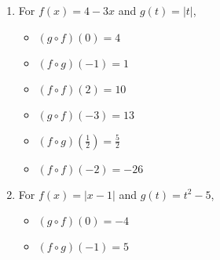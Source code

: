 \begin{enumerate}
\begin{multicols}{3}
\begin{itemize}
\item  $(g\circ f)(-3) = -48$

\item  $(f\circ g)\left(\frac{1}{2}\right) = \frac{13}{4}$

\item  $(f \circ f)(-2) = -2$

\end{itemize}

\end{multicols}

\item  For   $f(x) = 4-3x$ and  $g(t) = |t|$,
\begin{multicols}{3}

\begin{itemize}

\item  $(g\circ f)(0) = 4$

\item  $(f\circ g)(-1) = 1$

\item  $(f \circ f)(2) = 10$

\end{itemize}

\end{multicols}

\begin{multicols}{3}

\begin{itemize}

\item  $(g\circ f)(-3) = 13$

\item  $(f\circ g)\left(\frac{1}{2}\right) = \frac{5}{2}$

\item  $(f \circ f)(-2) = -26$

\end{itemize}

\end{multicols}

\item  For   $f(x) = |x-1|$ and $g(t) = t^2-5$,
\begin{multicols}{3}

\begin{itemize}

\item  $(g\circ f)(0) = -4$

\item  $(f\circ g)(-1) = 5$


\end{itemize}
\end{multicols}
\end{enumerate}
